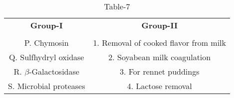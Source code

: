 \begin{table}[htbp]
  \centering
  \caption{Table-7}
  \label{tab:tables/table7.tex}
  \begin{tabular}{cc}
  \textbf{Group-I} & \textbf{Group-II} \\ \\
    P. Chymosin & 1. Removal of cooked flavor from milk \\
    Q. Sulfhydryl oxidase & 2. Soyabean milk coagulation \\
    R. $\beta$-Galactosidase & 3. For rennet puddings \\
    S. Microbial proteases & 4. Lactose removal \\
  \end{tabular}
\end{table}